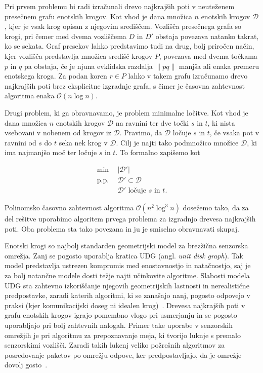 \documentclass[a4paper, 12pt]{book}
\newcommand{\D}{\ensuremath{\mathcal{D}}}
\newcommand{\OO}{\ensuremath{\mathcal{O}}} %
\begin{document}
Pri prvem problemu bi radi izračunali drevo najkrajših poti v neuteženem presečnem grafu enotskih krogov. Kot vhod je dana množica $n$ enotskih krogov $\D$, kjer je vsak krog opisan z njegovim središčem. Vozlišča presečnega grafa so krogi, pri čemer med dvema vozliščema $D$ in $D'$ obstaja povezava natanko takrat, ko se sekata. Graf presekov lahko predstavimo tudi na drug, bolj priročen način, kjer vozlišča predstavlja množica središč krogov $P$, povezava med dvema točkama $p$ in $q$ pa obstaja, če je njuna evklidska razdalja $\|pq\|$ manjša ali enaka premeru enotskega kroga. Za podan koren $r \in P$ lahko v takem grafu izračunamo drevo najkrajših poti brez eksplicitne izgradnje grafa, s čimer je časovna zahtevnost algoritma enaka $\OO(n\log n)$.

Drugi problem, ki ga obravnavamo, je problem minimalne ločitve. Kot vhod je dana množica $n$ enotskih krogov $\D$ na ravnini ter dve točki $s$ in $t$, ki nista vsebovani v nobenem od krogov iz $\D$. Pravimo, da $\D$ ločuje $s$ in $t$, če vsaka pot v ravnini od $s$ do $t$ seka nek krog v $\D$. Cilj je najti tako podmnožico množice $\D$, ki ima najmanjšo moč ter ločuje $s$ in $t$. To formalno zapišemo kot 

\begin{align*}
	\min ~~		& |\D'|\\
	 \mbox{p.p.}~~ & \D'\subset \D\\
				&	\D'\text{ ločuje $s$ in $t$}. 
\end{align*}

Polinomsko časovno zahtevnost algoritma $\OO(n^2\log^3n)$ dosežemo tako, da za del rešitve uporabimo algoritem prvega problema za izgradnjo drevesa najkrajših poti. Oba problema sta tako povezana in ju je smiselno obravnavati skupaj.

Enotski krogi so najbolj standarden geometrijski model za brezžična senzorska omrežja. Zanj se pogosto uporablja kratica UDG (angl. \textit{unit disk graph}). Tak model predstavlja ustrezen kompromis med enostavnostjo in natačnostjo, saj je za bolj natančne modele dosti težje najti učinkovite algoritme. Slabosti modela UDG sta zahtevno izkoriščanje njegovih geometrijskih lastnosti in nerealistične predpostavke, zaradi katerih algoritmi, ki se zanašajo nanj, pogosto odpovejo v praksi (kjer komunikacijski doseg ni idealen krog)~\cite{WGM06}. Drevesa najkrajših poti v grafu enotskih krogov igrajo pomembno vlogo pri usmerjanju in se pogosto uporabljajo pri bolj zahtevnih nalogah. Primer take uporabe v senzorskih omrežjih je pri algoritmu za prepoznavanje meja, ki tvorijo luknje s premalo senzorskimi vozlišči. Zaradi takih lukenj veliko požrešnih algoritmov za posredovanje paketov po omrežju odpove, ker predpostavljajo, da je omrežje dovolj gosto~\cite{FGG06}.
\end{document}
